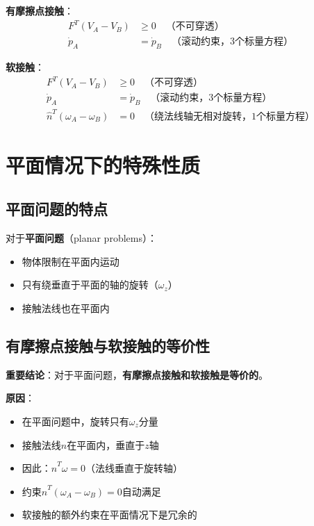 \documentclass[12pt,a4paper]{article}
\begin{document}
\textbf{有摩擦点接触}：
\begin{align}
F^T (V_A - V_B) &\geq 0 \quad \text{（不可穿透）} \\
\dot{p}_A &= \dot{p}_B \quad \text{（滚动约束，3个标量方程）}
\end{align}

\textbf{软接触}：
\begin{align}
F^T (V_A - V_B) &\geq 0 \quad \text{（不可穿透）} \\
\dot{p}_A &= \dot{p}_B \quad \text{（滚动约束，3个标量方程）} \\
\hat{n}^T (\omega_A - \omega_B) &= 0 \quad \text{（绕法线轴无相对旋转，1个标量方程）}
\end{align}

\section{平面情况下的特殊性质}

\subsection{平面问题的特点}

对于\textbf{平面问题}（planar problems）：
\begin{itemize}
\item 物体限制在平面内运动
\item 只有绕垂直于平面的轴的旋转（$\omega_z$）
\item 接触法线也在平面内
\end{itemize}

\subsection{有摩擦点接触与软接触的等价性}

\textbf{重要结论}：对于平面问题，\textbf{有摩擦点接触和软接触是等价的}。

\textbf{原因}：
\begin{itemize}
\item 在平面问题中，旋转只有$\omega_z$分量
\item 接触法线$\hat{n}$在平面内，垂直于$z$轴
\item 因此：$\hat{n}^T \omega = 0$（法线垂直于旋转轴）
\item 约束$\hat{n}^T (\omega_A - \omega_B) = 0$自动满足
\item 软接触的额外约束在平面情况下是冗余的
\end{itemize}
\end{document}
